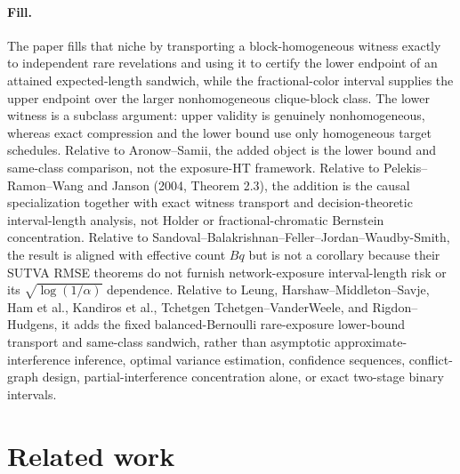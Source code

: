 \documentclass{article}
\begin{document}
\paragraph{Fill.} The paper fills that niche by transporting a block-homogeneous witness exactly to independent rare revelations and using it to certify the lower endpoint of an attained expected-length sandwich, while the fractional-color interval supplies the upper endpoint over the larger nonhomogeneous clique-block class. The lower witness is a subclass argument: upper validity is genuinely nonhomogeneous, whereas exact compression and the lower bound use only homogeneous target schedules. Relative to Aronow--Samii, the added object is the lower bound and same-class comparison, not the exposure-HT framework. Relative to Pelekis--Ramon--Wang and Janson (2004, Theorem 2.3), the addition is the causal specialization together with exact witness transport and decision-theoretic interval-length analysis, not Holder or fractional-chromatic Bernstein concentration. Relative to Sandoval--Balakrishnan--Feller--Jordan--Waudby-Smith, the result is aligned with effective count \(Bq\) but is not a corollary because their SUTVA RMSE theorems do not furnish network-exposure interval-length risk or its \(\sqrt{\log(1/\alpha)}\) dependence. Relative to Leung, Harshaw--Middleton--Savje, Ham et al., Kandiros et al., Tchetgen Tchetgen--VanderWeele, and Rigdon--Hudgens, it adds the fixed balanced-Bernoulli rare-exposure lower-bound transport and same-class sandwich, rather than asymptotic approximate-interference inference, optimal variance estimation, confidence sequences, conflict-graph design, partial-interference concentration alone, or exact two-stage binary intervals.

\section{Related work}
\end{document}
